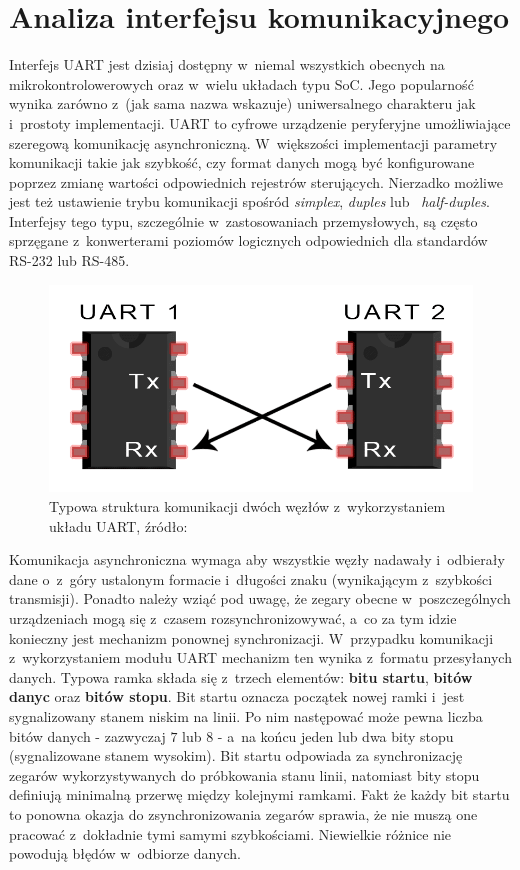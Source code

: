 \section{Analiza interfejsu komunikacyjnego}

Interfejs UART jest dzisiaj dostępny w~niemal wszystkich obecnych na mikrokontrolowerowych oraz w~wielu układach typu SoC. Jego popularność wynika zarówno z~(jak sama nazwa wskazuje) uniwersalnego charakteru jak i~prostoty implementacji. UART to cyfrowe urządzenie peryferyjne umożliwiające szeregową komunikację asynchroniczną. W~większości implementacji parametry komunikacji takie jak szybkość, czy format danych mogą być konfigurowane poprzez zmianę wartości odpowiednich rejestrów sterujących. Nierzadko możliwe jest też ustawienie trybu komunikacji spośród \textit{simplex}, \textit{duples} lub ~\textit{half-duples}. Interfejsy tego typu, szczególnie w~zastosowaniach przemysłowych, są często sprzęgane z~konwerterami poziomów logicznych odpowiednich dla standardów RS-232 lub RS-485.

\begin{figure}
    \centering
    \includegraphics[scale=0.5]{img/uart.png}
    \captionsetup{format=plain,justification=centering}
    \caption{Typowa struktura komunikacji dwóch węzłów z~wykorzystaniem układu UART, źródło: \cite{uart}}
    \label{UART}
\end{figure}

Komunikacja asynchroniczna wymaga aby wszystkie węzły nadawały i~odbierały dane o~z~góry ustalonym formacie i~długości znaku (wynikającym z~szybkości transmisji). Ponadto należy wziąć pod uwagę, że zegary obecne w~poszczególnych urządzeniach mogą się z~czasem rozsynchronizowywać, a~co za tym idzie konieczny jest mechanizm ponownej synchronizacji. W~przypadku komunikacji z~wykorzystaniem modułu UART mechanizm ten wynika z~formatu przesyłanych danych. Typowa ramka składa się z~trzech elementów: \textbf{bitu startu}, \textbf{bitów danyc} oraz \textbf{bitów stopu}. Bit startu oznacza początek nowej ramki i~jest sygnalizowany stanem niskim na linii. Po nim następować może pewna liczba bitów danych - zazwyczaj $7$ lub $8$  - a~na końcu jeden lub dwa bity stopu (sygnalizowane stanem wysokim). Bit startu odpowiada za synchronizację zegarów wykorzystywanych do próbkowania stanu linii, natomiast bity stopu definiują minimalną przerwę między kolejnymi ramkami. Fakt że każdy bit startu to ponowna okazja do zsynchronizowania zegarów sprawia, że nie muszą one pracować z~dokładnie tymi samymi szybkościami. Niewielkie różnice nie powodują błędów w~odbiorze danych.

